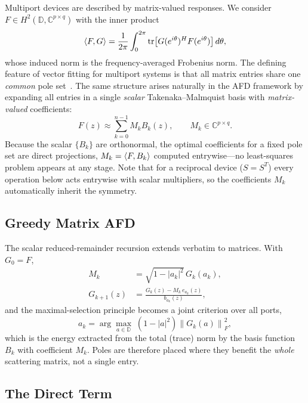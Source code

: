 \documentclass[journal]{IEEEtran}%
\newcommand{\inner}[2]{\braket{#1,#2}}
\begin{document}
Multiport devices are described by matrix-valued responses. We consider $F \in H^2(\mathbb{D}, \mathbb{C}^{p\times q})$ with the inner product
\begin{equation}
  \inner{F}{G} = \frac{1}{2\pi}\int_0^{2\pi} \operatorname{tr}\!\left[ G(e^{i\theta})^{H} F(e^{i\theta})\right] d\theta,
\end{equation}
whose induced norm is the frequency-averaged Frobenius norm. The defining feature of vector fitting for multiport systems is that all matrix entries share one \emph{common} pole set~\cite{deschrijver2008macromodeling}. The same structure arises naturally in the AFD framework by expanding all entries in a single \emph{scalar} Takenaka--Malmquist basis with \emph{matrix-valued} coefficients:
\begin{equation}\label{eq:mimo_expansion}
  F(z) \approx \sum_{k=0}^{n-1} M_k B_k(z), \qquad M_k \in \mathbb{C}^{p\times q}.
\end{equation}
Because the scalar $\{B_k\}$ are orthonormal, the optimal coefficients for a fixed pole set are direct projections, $M_k = \inner{F}{B_k}$ computed entrywise---no least-squares problem appears at any stage. Note that for a reciprocal device ($S = S^{T}$) every operation below acts entrywise with scalar multipliers, so the coefficients $M_k$ automatically inherit the symmetry.

\subsection{Greedy Matrix AFD}

The scalar reduced-remainder recursion extends verbatim to matrices. With $G_0 = F$,
\begin{align}
  M_k &= \sqrt{1-|a_k|^2}\, G_k(a_k), \nonumber \\
  G_{k+1}(z) &= \frac{G_k(z) - M_k\, e_{a_k}(z)}{b_{a_k}(z)}, \label{eq:matrix_recursion}
\end{align}
and the maximal-selection principle becomes a joint criterion over all ports,
\begin{equation}\label{eq:frob_msp}
  a_k = \arg\max_{a\in\mathbb{D}}\; \left(1-|a|^2\right) \left\| G_k(a) \right\|_F^2 ,
\end{equation}
which is the energy extracted from the total (trace) norm by the basis function $B_k$ with coefficient $M_k$. Poles are therefore placed where they benefit the \emph{whole} scattering matrix, not a single entry.

\subsection{The Direct Term}
\end{document}
